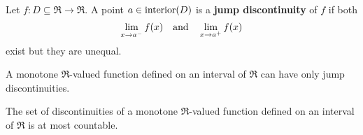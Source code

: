 \begin{definition}\quad
Let $f : D \subseteq \Re \longrightarrow \Re$.
A point $a \in \textnormal{interior}(D)$ is a \textbf{jump discontinuity} of $f$ if both
\begin{equation*}
\lim_{x \rightarrow a^{-}} f(x)
\quad\textnormal{and}\quad
\lim_{x \rightarrow a^{+}} f(x)
\end{equation*}
exist but they are unequal.
\end{definition}

\begin{corollary}\quad
A monotone $\Re$-valued function defined on an interval of $\Re$ can have only jump discontinuities.
\end{corollary}

\begin{theorem}\mbox{}\vskip 0.1cm
\noindent
The set of discontinuities of a monotone $\Re$-valued function defined on an interval of $\Re$ is at most countable.
\end{theorem}

